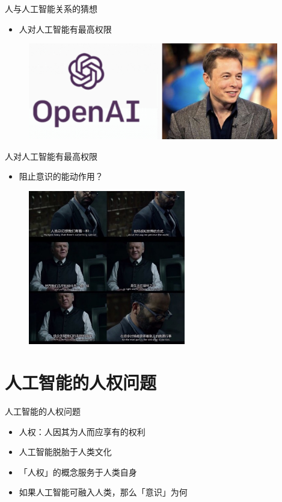 \documentclass{beamer}
\begin{document}
 \begin{frame}{人与人工智能关系的猜想}
    \begin{itemize}
     \item  人对人工智能有最高权限
    \end{itemize}

   \begin{figure}[H]
   \centering
   \includegraphics[width=4.3in]{gtyPic2.jpg}
   \end{figure}

  \end{frame}

 \begin{frame}{人对人工智能有最高权限}
    \begin{itemize}
     \item  阻止意识的能动作用？
    \end{itemize}

   \begin{figure}[H]
   \centering
   \includegraphics[height=2.65in]{gtyPic3.jpg}
   \end{figure}

  \end{frame}

  \section{人工智能的人权问题}
  \begin{frame}{人工智能的人权问题}
    \begin{itemize}
     \item 人权：人因其为人而应享有的权利
     \item 人工智能脱胎于人类文化
     \item 「人权」的概念服务于人类自身  
     \item 如果人工智能可融入人类，那么「意识」为何
    \end{itemize}
  \end{frame}
\end{document}
